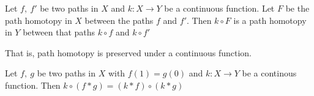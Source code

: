 \begin{lemma}
	Let $f,\ f'$ be two paths in $X$ and $k : X \to Y$ be a continuous function.
	Let $F$ be the path homotopy in $X$ between the paths $f$ and $f'$.
	Then $k \circ{} F$ is a path homotopy in $Y$ between that paths $k \circ{} f$ and $k \circ{} f'$
	\begin{commentary} That is, path homotopy is preserved under a continuous function.
	\end{commentary}
\end{lemma}

\begin{lemma}
	Let $f,\ g$ be two paths in $X$ with $f(1) = g(0)$ and $k : X \to Y$ be a continous function.
	Then $k \circ{} (f \ast{} g) = (k \ast{} f) \circ{} (k \ast{} g)$
\end{lemma}

